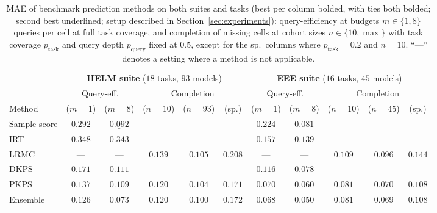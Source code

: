 \documentclass{article}
\theoremstyle{definition}
\theoremstyle{plain}
\newcommand{\PKPS}{PKPS\xspace}
\begin{document}
\begin{table}[t!]
\centering
\caption{MAE of benchmark prediction methods on both suites and tasks (best per column
bolded, with ties both bolded; second best underlined; setup described in
Section~\ref{sec:experiments}):
query-efficiency at budgets $m\in\{1,8\}$ queries per cell at full task coverage, and
completion of missing cells at cohort sizes $n\in\{10,\max\}$ with task coverage
$p_{\mathrm{task}}$ and query depth $p_{\mathrm{query}}$ fixed at $0.5$, except for the
sp.\ columns where $p_{\mathrm{task}}{=}0.2$ and $n{=}10$. ``---'' denotes a setting where a method is not
applicable.}
\label{tab:suite}
\footnotesize
\setlength{\tabcolsep}{3.4pt}\renewcommand{\arraystretch}{0.95}
\begin{tabular}{lccccc ccccc}
\toprule
 & \multicolumn{5}{c}{\textbf{HELM suite} ($18$ tasks, $93$ models)}
 & \multicolumn{5}{c}{\textbf{EEE suite} ($16$ tasks, $45$ models)} \\
\cmidrule(lr){2-6}\cmidrule(lr){7-11}
 & \multicolumn{2}{c}{Query-eff.} & \multicolumn{3}{c}{Completion}
 & \multicolumn{2}{c}{Query-eff.} & \multicolumn{3}{c}{Completion} \\
Method & ($m{=}1$) & ($m{=}8$) & ($n{=}10$) & ($n{=}93$) & (sp.)
       & ($m{=}1$) & ($m{=}8$) & ($n{=}10$) & ($n{=}45$) & (sp.) \\
\midrule
Sample score       & $0.292$ & $\underline{0.092}$ & --- & --- & --- & $0.224$ & $0.081$ & --- & --- & --- \\
IRT                & $0.348$ & $0.343$ & --- & --- & --- & $0.157$ & $0.139$ & --- & --- & --- \\
LRMC               & --- & --- & $0.139$ & $0.105$ & $0.208$ & --- & --- & $0.109$ & $0.096$ & $0.144$ \\
DKPS               & $0.171$ & $0.111$ & --- & --- & --- & $0.116$ & $0.078$ & --- & --- & --- \\
\PKPS              & $\underline{0.137}$ & $0.109$ & $\mathbf{0.120}$ & $\underline{0.104}$ & $\mathbf{0.171}$ & $\underline{0.070}$ & $\underline{0.060}$ & $\mathbf{0.081}$ & $\underline{0.070}$ & $\mathbf{0.108}$ \\
Ensemble           & $\mathbf{0.126}$ & $\mathbf{0.073}$ & $\mathbf{0.120}$ & $\mathbf{0.100}$ & $\underline{0.172}$ & $\mathbf{0.068}$ & $\mathbf{0.050}$ & $\mathbf{0.081}$ & $\mathbf{0.069}$ & $\mathbf{0.108}$ \\
\bottomrule
\end{tabular}
\end{table}
\end{document}
